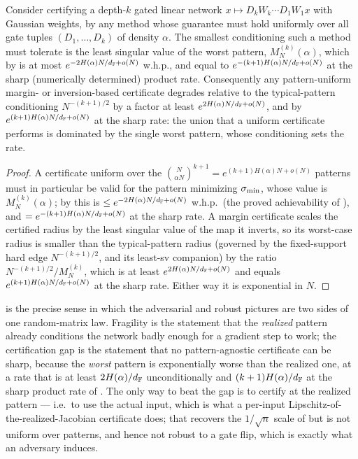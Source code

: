 \begin{theorem}\label{thm:cert-gap}
Consider certifying a depth-$k$ gated linear network $x\mapsto D_kW_k\cdots D_1W_1x$ with Gaussian
weights, by any method whose guarantee must hold uniformly over all gate tuples
$(D_1,\dots,D_k)$ of density $\alpha$. The smallest conditioning such a method must tolerate is the
least singular value of the worst pattern, $M_N^{(k)}(\alpha)$, which by  is at most
$e^{-2H(\alpha)N/d_{\mathbb{F}}+o(N)}$ w.h.p., and equal to $e^{-(k+1)H(\alpha)N/d_{\mathbb{F}}+o(N)}$ at the sharp
(numerically determined) product rate. Consequently any pattern-uniform margin- or inversion-based
certificate degrades relative to the typical-pattern conditioning $N^{-(k+1)/2}$ by a factor at least
$e^{2H(\alpha)N/d_{\mathbb{F}}+o(N)}$, and by $e^{(k+1)H(\alpha)N/d_{\mathbb{F}}+o(N)}$ at the sharp rate: the union that a
uniform certificate performs is dominated by the single worst pattern, whose conditioning sets the rate.
\end{theorem}

\begin{proof}
A certificate uniform over the $\binom N{\alpha N}^{k+1}=e^{(k+1)H(\alpha)N+o(N)}$ patterns must in
particular be valid for the pattern minimizing $\sigma_{\min}$, whose value is $M_N^{(k)}(\alpha)$; by
 this is $\le e^{-2H(\alpha)N/d_{\mathbb{F}}+o(N)}$ w.h.p.\ (the proved achievability of
), and $=e^{-(k+1)H(\alpha)N/d_{\mathbb{F}}+o(N)}$ at the sharp rate. A margin certificate
scales the certified radius by the least singular value of the map it inverts, so its worst-case radius
is smaller than the typical-pattern radius (governed by the fixed-support hard edge $N^{-(k+1)/2}$,
 and its least-sv companion) by the ratio $N^{-(k+1)/2}/M_N^{(k)}$, which is at least
$e^{2H(\alpha)N/d_{\mathbb{F}}+o(N)}$ and equals $e^{(k+1)H(\alpha)N/d_{\mathbb{F}}+o(N)}$ at the sharp rate. Either way it is
exponential in $N$.
\end{proof}

\begin{remark}[Interpretation]\label{rem:cert-interp}
 is the precise sense in which the adversarial and robust pictures are two sides of
one random-matrix law. Fragility is the statement that the \emph{realized} pattern already conditions
the network badly enough for a gradient step to work; the certification gap is the statement that no
pattern-agnostic certificate can be sharp, because the \emph{worst} pattern is exponentially worse than
the realized one, at a rate that is at least $2H(\alpha)/d_{\mathbb{F}}$ unconditionally and $(k+1)H(\alpha)/d_{\mathbb{F}}$ at
the sharp product rate of . The only way
to beat the gap is to certify at the realized pattern --- i.e.\ to use the actual input, which is what a
per-input Lipschitz-of-the-realized-Jacobian certificate does; that recovers the $1/\sqrt n$ scale of
 but is not uniform over patterns, and hence not robust to a gate flip, which is
exactly what an adversary induces.
\end{remark}

